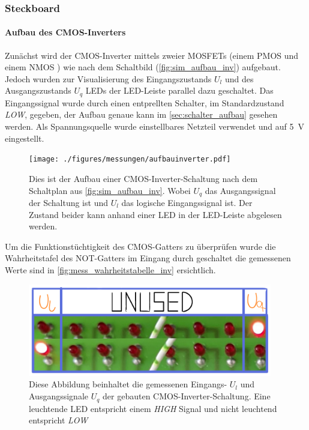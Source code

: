 \documentclass[12pt,english,ngerman]{scrartcl}
\begin{document}
\subsubsection{Steckboard}
\paragraph{Aufbau des CMOS-Inverters}\label{sec:mess_cmos}
Zunächst wird der CMOS-Inverter mittels zweier MOSFETs (einem PMOS \cite{ZVP2106A} und
einem NMOS \cite{ZVN2106A}) wie nach dem Schaltbild (\autoref{fig:sim_aufbau_inv})
aufgebaut. Jedoch wurden zur Visualisierung des Eingangszustands $U_l$ und des
Ausgangszustands $U_q$ LEDs der LED-Leiste parallel dazu geschaltet. Das
Eingangssignal wurde durch einen entprellten Schalter, im Standardzustand
\textit{LOW}, gegeben, der Aufbau genaue kann im \autoref{sec:schalter_aufbau} gesehen werden. Als
Spannungsquelle wurde einstellbares Netzteil verwendet und auf \SI{5}{\volt}
eingestellt. 

\begin{figure}[H]
  \centering
    \texttt{[image: ./figures/messungen/aufbauinverter.pdf]}
  \caption{Dies ist der Aufbau einer CMOS-Inverter-Schaltung nach dem
  Schaltplan aus \autoref{fig:sim_aufbau_inv}. Wobei $U_q$ das Ausgangssignal
  der Schaltung ist  und $U_l$ das logische Eingangssignal ist. Der Zustand
  beider kann anhand einer LED in der LED-Leiste abgelesen werden.}
  \label{fig:mess_aufbau_inv}
\end{figure}


Um die Funktionstüchtigkeit des CMOS-Gatters zu überprüfen wurde die
Wahrheitstafel des NOT-Gatters im Eingang durch geschaltet die gemessenen Werte
sind in \autoref{fig:mess_wahrheitstabelle_inv} ersichtlich.

\begin{figure}[H]
  \centering
    \includegraphics[width=0.95\textwidth]{./figures/messungen/WahrheitstabelleInverter.pdf}
  \caption{Diese Abbildung beinhaltet die gemessenen Eingangs- $U_l$ und
  Ausgangssignale $U_q$ der gebauten CMOS-Inverter-Schaltung. Eine leuchtende
  LED entspricht einem \textit{HIGH} Signal und nicht leuchtend entspricht
  \textit{LOW}} 
\label{fig:mess_wahrheitstabelle_inv}
\end{figure}
\end{document}
